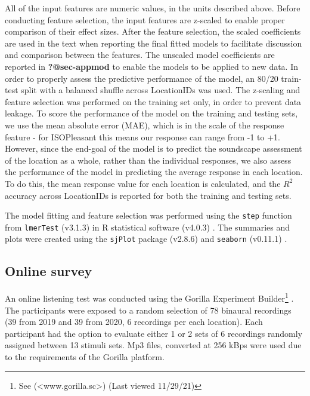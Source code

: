 \documentclass[
  authoryear,
  preprint,
  3p,
  onecolumn]{elsarticle}
\begin{document}
All of the input features are numeric values, in the units described
above. Before conducting feature selection, the input features are
z-scaled to enable proper comparison of their effect sizes. After the
feature selection, the scaled coefficients are used in the text when
reporting the final fitted models to facilitate discussion and
comparison between the features. The unscaled model coefficients are
reported in \textbf{?@sec-appmod} to enable the models to be applied to
new data. In order to properly assess the predictive performance of the
model, an 80/20 train-test split with a balanced shuffle across
LocationIDs was used. The z-scaling and feature selection was performed
on the training set only, in order to prevent data leakage. To score the
performance of the model on the training and testing sets, we use the
mean absolute error (MAE), which is in the scale of the response feature
- for ISOPleasant this means our response can range from -1 to +1.
However, since the end-goal of the model is to predict the soundscape
assessment of the location as a whole, rather than the individual
responses, we also assess the performance of the model in predicting the
average response in each location. To do this, the mean response value
for each location is calculated, and the \(R^2\) accuracy across
LocationIDs is reported for both the training and testing sets.

The model fitting and feature selection was performed using the
\texttt{step} function from \texttt{lmerTest} (v3.1.3)
\citep{Kuznetsova2017lmerTest} in R statistical software (v4.0.3)
\citep{RCT2018R}. The summaries and plots were created using the
\texttt{sjPlot} package (v2.8.6) \citep{Luedecke2021sjPlot} and
\texttt{seaborn} (v0.11.1) \citep{Waskom2021seaborn}.

\hypertarget{online-survey}{%
\subsection{Online survey}\label{online-survey}}

An online listening test was conducted using the Gorilla Experiment
Builder\footnote{See (\textless www.gorilla.sc\textgreater) (Last viewed
  11/29/21)} \citep{AnwylIrvine2019Gorilla}. The participants were
exposed to a random selection of 78 binaural recordings (39 from 2019
and 39 from 2020, 6 recordings per each location). Each participant had
the option to evaluate either 1 or 2 sets of 6 recordings randomly
assigned between 13 stimuli sets. Mp3 files, converted at 256 kBps were
used due to the requirements of the Gorilla platform.
\end{document}
